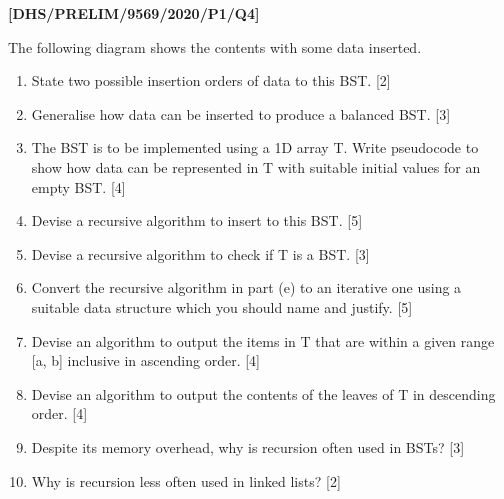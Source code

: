 \item \textbf{{[}DHS/PRELIM/9569/2020/P1/Q4{]} }

The following diagram shows the contents with some data inserted. 
\begin{enumerate}
\item State two possible insertion orders of data to this BST.\hfill{}
{[}2{]}
\item Generalise how data can be inserted to produce a balanced BST.\hfill{}
{[}3{]}
\item The BST is to be implemented using a 1D array T. Write pseudocode
to show how data can be represented in T with suitable initial values
for an empty BST. \hfill{}{[}4{]}
\item Devise a recursive algorithm to insert to this BST. \hfill{}{[}5{]}
\item Devise a recursive algorithm to check if T is a BST. \hfill{}{[}3{]}
\item Convert the recursive algorithm in part (e) to an iterative one using
a suitable data structure which you should name and justify. \hfill{}{[}5{]}
\item Devise an algorithm to output the items in T that are within a given
range {[}a, b{]} inclusive in ascending order.\hfill{} {[}4{]}
\item Devise an algorithm to output the contents of the leaves of T in descending
order.\hfill{} {[}4{]}
\item Despite its memory overhead, why is recursion often used in BSTs?
\hfill{}{[}3{]}
\item Why is recursion less often used in linked lists?\hfill{} {[}2{]}
\end{enumerate}
